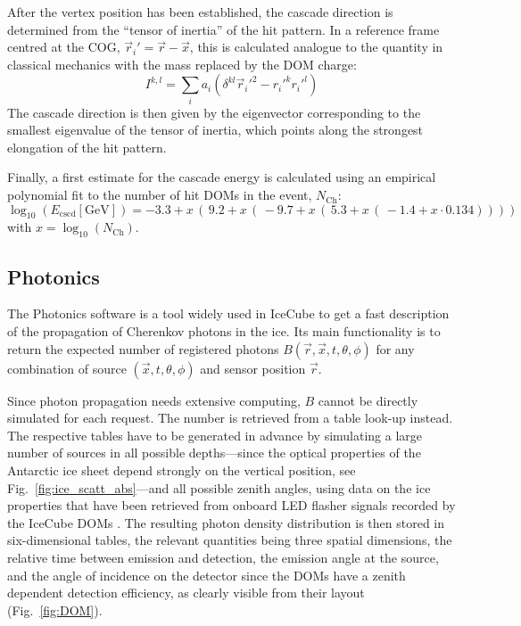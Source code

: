 After the vertex position has been established, the cascade direction is
determined from the ``tensor of inertia'' of the hit pattern. In a reference
frame centred at the COG, $\vec{r}_i' = \vec{r} - \vec{x}$, this is calculated
analogue to the quantity in classical mechanics with the mass replaced by the
DOM charge:
\begin{equation}
 I^{k,l} = \sum_i a_i \left(\delta^{kl} \vec{r}_i'^2 - r_i'^k r_i'^l\right)
\end{equation}
The cascade direction is then given by the eigenvector corresponding to the
smallest eigenvalue of the tensor of inertia, which points along the strongest
elongation of the hit pattern.

Finally, a first estimate for the cascade energy is calculated using an
empirical polynomial fit \cite{Processing} to the number of hit DOMs in the
event, $N_\mathrm{Ch}$:
\begin{equation}
 \log_{10}\left(E_\mathrm{cscd} [\mathrm{GeV}]\right) =
  -3.3 + x\,(\,9.2 + x\,(\,-9.7 + x\,(\,5.3 + x\,(\,-1.4 + x\cdot 0.134))))
\end{equation}
with $x = \log_{10}(N_\mathrm{Ch})$.

\subsection{Photonics}
\label{sec:reco_photonics}

The Photonics software \cite{Photonics} is a tool widely used in IceCube to get
a fast description of the propagation of Cherenkov photons in the ice. Its main
functionality is to return the expected number of registered photons
$B(\vec{r}, \vec{x}, t, \theta, \phi)$ for any combination of source
$(\vec{x}, t, \theta, \phi)$ and sensor position $\vec{r}$.

Since photon propagation needs extensive computing, $B$ cannot be directly
simulated for each request. The number is retrieved from a table look-up
instead. The respective tables have to be generated in advance by simulating a
large number of sources in all possible depths---since the optical properties
of the Antarctic ice sheet depend strongly on the vertical position, see
Fig.~\ref{fig:ice_scatt_abs}---and all possible zenith angles, using data on the
ice properties that have been retrieved from onboard LED flasher signals
recorded by the IceCube DOMs \cite{Dima}. The resulting photon density
distribution is then stored in six-dimensional tables, the relevant quantities
being three spatial dimensions, the relative time between emission and
detection, the emission angle at the source, and the angle of incidence on the
detector since the DOMs have a zenith dependent detection efficiency, as clearly
visible from their layout (Fig.~\ref{fig:DOM}).

